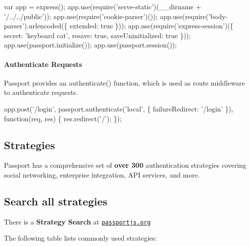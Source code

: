 \begin{DoxyCode}
var app = express();
app.use(require('serve-static')(\_\_dirname + '/../../public'));
app.use(require('cookie-parser')());
app.use(require('body-parser').urlencoded(\{ extended: true \}));
app.use(require('express-session')(\{ secret: 'keyboard cat', resave: true, saveUninitialized: true \}));
app.use(passport.initialize());
app.use(passport.session());
\end{DoxyCode}


\paragraph*{Authenticate Requests}

Passport provides an {\ttfamily authenticate()} function, which is used as route middleware to authenticate requests.


\begin{DoxyCode}
app.post('/login', 
  passport.authenticate('local', \{ failureRedirect: '/login' \}),
  function(req, res) \{
    res.redirect('/');
  \});
\end{DoxyCode}


\subsection*{Strategies}

Passport has a comprehensive set of {\bfseries over 300} authentication strategies covering social networking, enterprise integration, A\+PI services, and more.

\subsection*{Search all strategies}

There is a {\bfseries Strategy Search} at \href{http://passportjs.org}{\tt passportjs.\+org}

The following table lists commonly used strategies\+:

